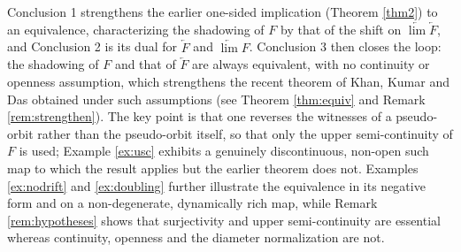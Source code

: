 \documentclass[12pt]{amsart}
\theoremstyle{definition}
\begin{document}
Conclusion 1 strengthens the earlier one-sided implication (Theorem \ref{thm2}) to an equivalence, characterizing the shadowing of $F$ by that of the shift on $\underleftarrow{\lim} \underleftarrow{F}$, and Conclusion 2 is its dual for $\underleftarrow{F}$ and $\underleftarrow{\lim} F$. Conclusion 3 then closes the loop: the shadowing of $F$ and that of $\underleftarrow{F}$ are always equivalent, with no continuity or openness assumption, which strengthens the recent theorem of Khan, Kumar and Das \cite{KhanKumarDas} obtained under such assumptions (see Theorem \ref{thm:equiv} and Remark \ref{rem:strengthen}). The key point is that one reverses the witnesses of a pseudo-orbit rather than the pseudo-orbit itself, so that only the upper semi-continuity of $F$ is used; Example \ref{ex:usc} exhibits a genuinely discontinuous, non-open such map to which the result applies but the earlier theorem does not. Examples \ref{ex:nodrift} and \ref{ex:doubling} further illustrate the equivalence in its negative form and on a non-degenerate, dynamically rich map, while Remark \ref{rem:hypotheses} shows that surjectivity and upper semi-continuity are essential whereas continuity, openness and the diameter normalization are not.
\end{document}
